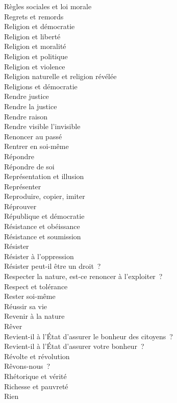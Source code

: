 \documentclass[a4paper,12pt]{article}
\begin{document}
Règles sociales et loi morale \\
Regrets et remords \\
Religion et démocratie \\
Religion et liberté \\
Religion et moralité \\
Religion et politique \\
Religion et violence \\
Religion naturelle et religion révélée \\
Religions et démocratie \\
Rendre justice \\
Rendre la justice \\
Rendre raison \\
Rendre visible l'invisible \\
Renoncer au passé \\
Rentrer en soi-même \\
Répondre \\
Répondre de soi \\
Représentation et illusion \\
Représenter \\
Reproduire, copier, imiter \\
Réprouver \\
République et démocratie \\
Résistance et obéissance \\
Résistance et soumission \\
Résister \\
Résister à l'oppression \\
Résister peut-il être un droit ? \\
Respecter la nature, est-ce renoncer à l'exploiter ? \\
Respect et tolérance \\
Rester soi-même \\
Réussir sa vie \\
Revenir à la nature \\
Rêver \\
Revient-il à l'État d'assurer le bonheur des citoyens ? \\
Revient-il à l'État d'assurer votre bonheur ? \\
Révolte et révolution \\
Rêvons-nous ? \\
Rhétorique et vérité \\
Richesse et pauvreté \\
Rien \\
\end{document}
